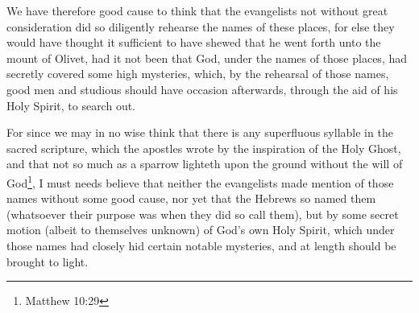 \documentclass[a5paper]{scrbook}
\begin{document}
	We have therefore good cause to think that the evangelists not without great consideration did so diligently rehearse the names of these places, for else they would have thought it sufficient to have shewed that he went forth unto the mount of Olivet, had it not been that God, under the names of those places, had secretly covered some high mysteries, which, by the rehearsal of those names, good men and studious should have occasion afterwards, through the aid of his Holy Spirit, to search out.
	
	For since we may in no wise think that there is any superfluous syllable in the sacred scripture, which the apostles wrote by the inspiration of the Holy Ghost, and that not so much as a sparrow lighteth upon the ground without the will of God\footnote{Matthew 10:29}, I must needs believe that neither the evangelists made mention of those names without some good cause, nor yet that the Hebrews so named them (whatsoever their purpose was when they did so call them), but by some secret motion (albeit to themselves unknown) of God's own Holy Spirit, which under those names had closely hid certain notable mysteries, and at length should be brought to light.
	
\end{document}
